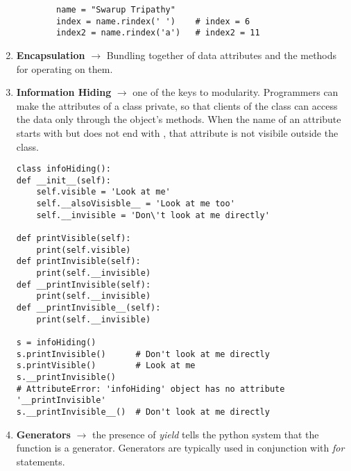 \documentclass[11pt]{article}
\begin{document}
\begin{enumerate}
\begin{verbatim}
        name = "Swarup Tripathy"
        index = name.rindex(' ')    # index = 6
        index2 = name.rindex('a')   # index2 = 11
        \end{verbatim}
        \item \textbf{Encapsulation} $\rightarrow$ Bundling together of data attributes and the methods for operating on them.
        \item \textbf{Information Hiding} $\rightarrow$ one of the keys to modularity. Programmers can make the attributes of a class private, so that clients of the class can access the data only through the object's methods.
        When the name of an attribute starts with \textunderscore\textunderscore but does not end with \textunderscore\textunderscore, that attribute is not visibile outside the class.
        \begin{verbatim}
class infoHiding():
def __init__(self):
    self.visible = 'Look at me'
    self.__alsoVisisble__ = 'Look at me too'
    self.__invisible = 'Don\'t look at me directly'

def printVisible(self):
    print(self.visible)
def printInvisible(self):
    print(self.__invisible)
def __printInvisible(self):
    print(self.__invisible)
def __printInvisible__(self):
    print(self.__invisible)

s = infoHiding()
s.printInvisible()      # Don't look at me directly
s.printVisible()        # Look at me
s.__printInvisible()    
# AttributeError: 'infoHiding' object has no attribute '__printInvisible'
s.__printInvisible__()  # Don't look at me directly
        \end{verbatim}
        \item \textbf{Generators} $\rightarrow$ the presence of \textit{yield} tells the python system that the function is a generator. Generators are typically used in conjunction with \textit{for} statements.
    \end{enumerate}
\end{document}
